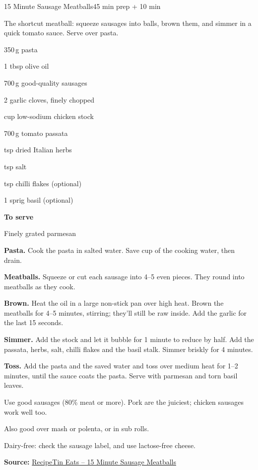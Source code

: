 \begin{recipebox}{15 Minute Sausage Meatballs}{4}{5 min prep + 10 min}

The shortcut meatball: squeeze sausages into balls, brown them, and simmer in a
quick tomato sauce. Serve over pasta.

\begin{ingredients}
  \item 350\,g pasta
  \item 1 tbsp olive oil
  \item 700\,g good-quality sausages
  \item 2 garlic cloves, finely chopped
  \item {} cup low-sodium chicken stock
  \item 700\,g tomato passata
  \item {} tsp dried Italian herbs
  \item {} tsp salt
  \item {} tsp chilli flakes (optional)
  \item 1 sprig basil (optional)
  \item[] \textbf{To serve}
  \item Finely grated parmesan
\end{ingredients}

\begin{method}
  \item \textbf{Pasta.} Cook the pasta in salted water. Save  cup of
        the cooking water, then drain.
  \item \textbf{Meatballs.} Squeeze or cut each sausage into 4--5 even pieces. They
        round into meatballs as they cook.
  \item \textbf{Brown.} Heat the oil in a large non-stick pan over high heat. Brown
        the meatballs for 4--5 minutes, stirring; they'll still be raw inside. Add
        the garlic for the last 15 seconds.
  \item \textbf{Simmer.} Add the stock and let it bubble for 1 minute to reduce by
        half. Add the passata, herbs, salt, chilli flakes and the basil stalk.
        Simmer briskly for 4 minutes.
  \item \textbf{Toss.} Add the pasta and the saved water and toss over medium heat
        for 1--2 minutes, until the sauce coats the pasta. Serve with parmesan and
        torn basil leaves.
\end{method}

\begin{notelist}
  \item Use good sausages (80\% meat or more). Pork are the juiciest; chicken
        sausages work well too.
  \item Also good over mash or polenta, or in sub rolls.
  \item Dairy-free: check the sausage label, and use lactose-free cheese.
\end{notelist}

\noindent\textbf{Source:} \href{https://www.recipetineats.com/15-minute-sausage-meatballs/}{RecipeTin Eats -- 15 Minute Sausage Meatballs}

\end{recipebox}
